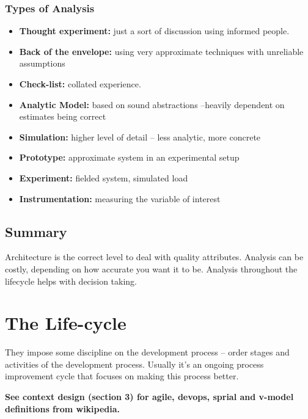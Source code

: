 \documentclass[a4paper]{article}
\begin{document}
\subsubsection{Types of Analysis}
\begin{itemize}
\item
\textbf{Thought experiment:} just a sort of discussion using informed people. 

\item
\textbf{Back of the envelope:} using very approximate techniques with unreliable assumptions

\item
\textbf{Check-list:} collated experience.

\item
\textbf{Analytic Model:} based on sound abstractions –heavily dependent on estimates being correct

\item
\textbf{Simulation:} higher level of detail – less analytic, more concrete 

\item
\textbf{Prototype:} approximate system in an experimental setup

\item
\textbf{Experiment:} fielded system, simulated load 

\item
\textbf{Instrumentation:} measuring the variable of interest
\end{itemize}

\subsection{Summary}
Architecture is the correct level to deal with quality attributes.
Analysis can be costly, depending on how accurate you want it to be.
Analysis throughout the lifecycle helps with decision taking.

\newpage
\section{The Life-cycle}
They impose some discipline on the development process – order stages and activities of the development process. Usually it's an ongoing process improvement cycle that focuses on making this process better.

\textbf{See context design (section 3) for agile, devops, sprial and v-model definitions from wikipedia.}
\end{document}
